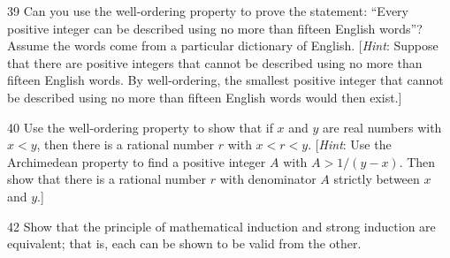 \documentclass[11pt]{article}
\begin{document}
\begin{exercise}{39}
    Can you use the well-ordering property to prove the statement:
    ``Every positive integer can be described using no more than
    fifteen English words''? Assume the words come from a particular
    dictionary of English.
    [\emph{Hint}: Suppose that there are positive integers that cannot
    be described using no more than fifteen English words. By
    well-ordering, the smallest positive integer that cannot be
    described using no more than fifteen English words would then
    exist.]
\end{exercise}

\begin{exercise}{40}
    Use the well-ordering property to show that if $x$ and $y$ are
    real numbers with $x < y$, then there is a rational number $r$
    with $x < r < y$.
    [\emph{Hint}: Use the Archimedean property to find a positive
    integer $A$ with $A > 1/(y-x)$. Then show that there is a rational
    number $r$ with denominator $A$ strictly between $x$ and $y$.]
\end{exercise}

\begin{exercise}{42}
    Show that the principle of mathematical induction and strong
    induction are equivalent; that is, each can be shown to be valid
    from the other.
\end{exercise}
\end{document}
